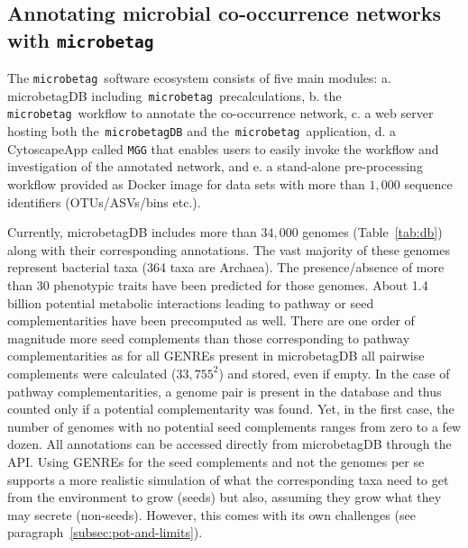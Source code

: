 \documentclass[sn-mathphys,Numbered]{sn-jnl}  %
\theoremstyle{thmstyleone}%
\theoremstyle{thmstyletwo}%
\theoremstyle{thmstylethree}%
\newcommand{\microbetag}{\texttt{microbetag}}
\begin{document}
    \subsection*{Annotating microbial co-occurrence networks with \microbetag}
    \label{subsec:running-wf}

        The \microbetag~\space software ecosystem consists of five main modules:
        a. microbetagDB including~\microbetag~\space precalculations,
        b. the \microbetag~\space workflow to annotate the co-occurrence network,
        c. a web server hosting both the~\texttt{microbetagDB} and the~\microbetag~\space application,
        d. a CytoscapeApp called \texttt{MGG} that enables users to easily invoke the workflow and investigation of the annotated network, and
        e. a stand-alone pre-processing workflow provided as Docker image for data sets with more than $1,000$ sequence identifiers (OTUs/ASVs/bins etc.).

        Currently, microbetagDB includes more than $34,000$ genomes (Table~\ref{tab:db}) along with their corresponding annotations.
        The vast majority of these genomes represent bacterial taxa (364 taxa are Archaea).
        The presence/absence of more than 30 phenotypic traits have been predicted for those genomes.
        About 1.4 billion potential metabolic interactions leading to pathway or seed complementarities have been precomputed as well.
        There are one order of magnitude more seed complements than those corresponding to pathway complementarities as for all GENREs present in microbetagDB all pairwise complements were calculated ($33,755^2$) and stored, even if empty.
        In the case of pathway complementarities, a genome pair is present in the database and thus counted only if a potential complementarity was found.
        Yet, in the first case, the number of genomes with no potential seed complements ranges from zero to a few dozen.
        All annotations can be accessed directly from microbetagDB through the API.
        Using GENREs for the seed complements and not the genomes per se supports a more realistic simulation of what the corresponding taxa need to get from the environment to grow (seeds) but also, assuming they grow what they may secrete (non-seeds).
        However, this comes with its own challenges (see paragraph~\ref{subsec:pot-and-limits}). 
\end{document}
